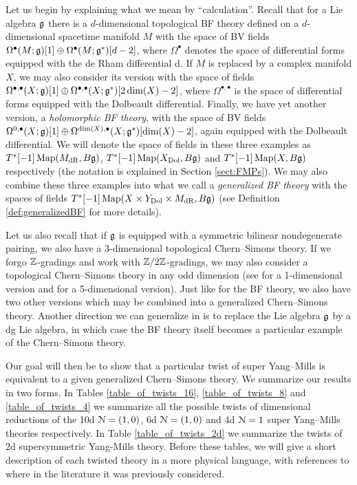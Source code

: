 \documentclass[10pt, oneside]{article}
\begin{document}
Let us begin by explaining what we mean by ``calculation''. Recall that for a Lie algebra $\mathfrak g$ there is a $d$-dimensional topological BF theory defined on a $d$-dimensional spacetime manifold $M$ with the space of BV fields $\Omega^\bullet(M; \mathfrak g)[1]\oplus \Omega^\bullet(M; \mathfrak g^*)[d-2]$, where $\Omega^\bullet$ denotes the space of differential forms equipped with the de Rham differential $\mathrm{d}$. If $M$ is replaced by a complex manifold $X$, we may also consider its version with the space of fields $\Omega^{\bullet, \bullet}(X; \mathfrak g)[1]\oplus \Omega^{\bullet, \bullet}(X; \mathfrak g^*)[2\dim(X)-2]$, where $\Omega^{\bullet, \bullet}$ is the space of differential forms equipped with the Dolbeault differential. Finally, we have yet another version, a \emph{holomorphic BF theory}, with the space of BV fields $\Omega^{0, \bullet}(X; \mathfrak g)[1]\oplus \Omega^{\dim(X), \bullet}(X; \mathfrak g^*)[\dim(X)-2]$, again equipped with the Dolbeault differential. We will denote the space of fields in these three examples as $T^*[-1]\operatorname{Map}(M_{\mathrm{dR}}, B\mathfrak g)$, $T^*[-1]\operatorname{Map}(X_{\mathrm{Dol}}, B\mathfrak g)$ and $T^*[-1]\operatorname{Map}(X, B\mathfrak g)$ respectively (the notation is explained in Section \ref{sect:FMPs}). We may also combine these three examples into what we call a \emph{generalized BF theory} with the spaces of fields $T^*[-1]\operatorname{Map}(X\times Y_{\mathrm{Dol}}\times M_{\mathrm{dR}}, B\mathfrak g)$ (see Definition \ref{def:generalizedBF} for more details).

Let us also recall that if $\mathfrak g$ is equipped with a symmetric bilinear nondegenerate pairing, we also have a 3-dimensional topological Chern--Simons theory. If we forgo $\mathbb Z$-gradings and work with $\mathbb Z/2\mathbb Z$-gradings, we may also consider a topological Chern--Simons theory in any odd dimension (see \cite{AlekseevMnev} for a 1-dimensional version and \cite{BakGustavsson2} for a 5-dimensional version). Just like for the BF theory, we also have two other versions which may be combined into a generalized Chern--Simons theory. Another direction we can generalize in is to replace the Lie algebra $\mathfrak g$ by a dg Lie algebra, in which case the BF theory itself becomes a particular example of the Chern--Simons theory.

Our goal will then be to show that a particular twist of super Yang--Mills is equivalent to a given generalized Chern--Simons theory. We summarize our results in two forms. In Tables \ref{table_of_twists_16}, \ref{table_of_twists_8} and \ref{table_of_twists_4} we summarize all the possible twists of dimensional reductions of the 10d $\mathcal N=(1, 0)$, 6d $\mathcal N=(1, 0)$ and 4d $\mathcal N=1$ super Yang--Mills theories respectively.  In Table \ref{table_of_twists_2d} we summarize the twists of 2d supersymmetric Yang-Mills theory. Before these tables, we will give a short description of each twisted theory in a more physical language, with references to where in the literature it was previously considered.
\end{document}
